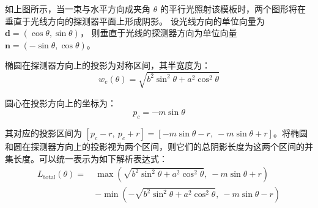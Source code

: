 如上图所示，当一束与水平方向成夹角 $\theta$ 的平行光照射该模板时，两个图形将在垂直于光线方向的探测器平面上形成阴影。
设光线方向的单位向量为 $\mathbf{d} = (\cos\theta, \sin\theta)$，
则垂直于光线的探测器方向为单位向量 $\mathbf{n} = (-\sin\theta, \cos\theta)$。

椭圆在探测器方向上的投影为对称区间，其半宽度为：
\[
w_e(\theta) = \sqrt{b^2 \sin^2\theta + a^2 \cos^2\theta}
\]

圆心在投影方向上的坐标为：
\[
p_c = -m \sin\theta
\]

其对应的投影区间为 $[p_c - r,\ p_c + r] = [-m \sin\theta - r,\ -m \sin\theta + r]$。将椭圆和圆在探测器方向上的投影视为两个区间，则它们的总阴影长度为这两个区间的并集长度。可以统一表示为如下解析表达式：
\begin{equation}
\begin{split}
L_{\text{total}}(\theta) =\ & \max\left( \sqrt{b^2 \sin^2\theta + a^2 \cos^2\theta},\ -m \sin\theta + r \right) \\
& - \min\left( -\sqrt{b^2 \sin^2\theta + a^2 \cos^2\theta},\ -m \sin\theta - r \right)
\end{split}
\end{equation}



